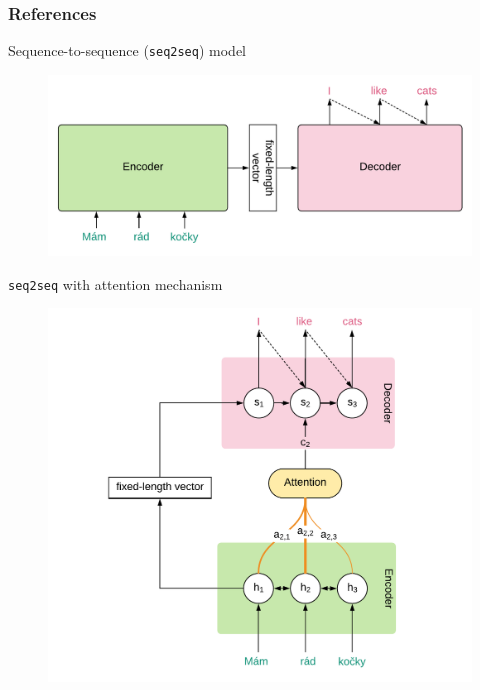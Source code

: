 \documentclass{beamer}
\def\seq2seq{\texttt{seq2seq}\xspace}
\begin{document}




\begin{frame}[allowframebreaks]
\frametitle{References}
\footnotesize{

}
\end{frame}


\begin{frame}{Sequence-to-sequence (\seq2seq) model \citep{DBLP:conf/nips/SutskeverVL14}}
\begin{figure}
    \includegraphics[width=0.6\linewidth]{img/seq2seq.pdf}
\end{figure}
\end{frame}


\begin{frame}{\seq2seq with attention mechanism \citep{bahdanau:etal:attention:iclr:2015,DBLP:conf/emnlp/LuongPM15}}
\begin{figure}[t]
    \includegraphics[width=0.6\linewidth]{img/seq2seq-att.pdf}
\end{figure}
\end{frame}
\end{document}

